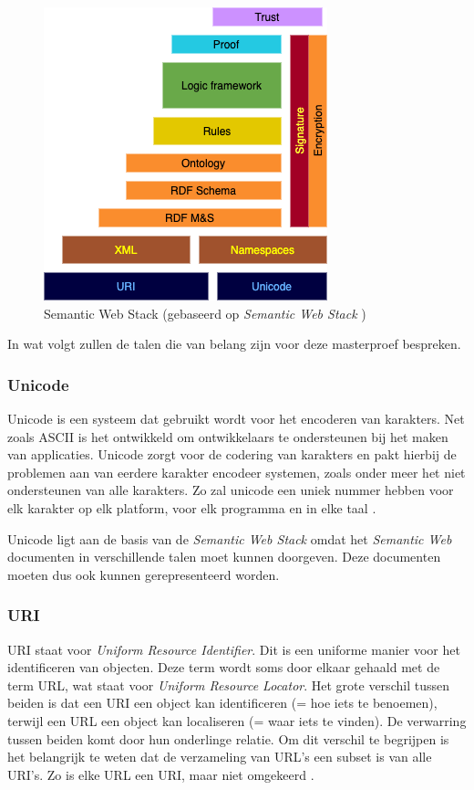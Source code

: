 \begin{figure}[ht]
    \centering
    \includegraphics[width=0.5\linewidth]{images/Semantic-Web-Stack.png}
    \caption{Semantic Web Stack (gebaseerd op \textit{Semantic Web Stack} \cite{semanticwebstack})}
    \label{fig:semantic_web_stack}
\end{figure}

In wat volgt zullen de talen die van belang zijn voor deze masterproef bespreken.

\subsubsection{Unicode}
Unicode is een systeem dat gebruikt wordt voor het encoderen van karakters. Net zoals ASCII is het ontwikkeld om ontwikkelaars te ondersteunen bij het maken van applicaties. Unicode zorgt voor de codering van karakters en pakt hierbij de problemen aan van eerdere karakter encodeer systemen, zoals onder meer het niet ondersteunen van alle karakters. Zo zal unicode een uniek nummer hebben voor elk karakter op elk platform, voor elk programma en in elke taal \cite{unicode}.

Unicode ligt aan de basis van de \textit{Semantic Web Stack} omdat het \textit{Semantic Web} documenten in verschillende talen moet kunnen doorgeven. Deze documenten moeten dus ook kunnen gerepresenteerd worden.

\subsubsection{URI}
URI staat voor \textit{Uniform Resource Identifier}. Dit is een uniforme manier voor het identificeren van objecten. Deze term wordt soms door elkaar gehaald met de term URL, wat staat voor \textit{Uniform Resource Locator}. Het grote verschil tussen beiden is dat een URI een object kan identificeren (= hoe iets te benoemen), terwijl een URL een object kan localiseren (= waar iets te vinden). De verwarring tussen beiden komt door hun onderlinge relatie. Om dit verschil te begrijpen is het belangrijk te weten dat de verzameling van URL's een subset is van alle URI's. Zo is elke URL een URI, maar niet omgekeerd \cite{uri}.

